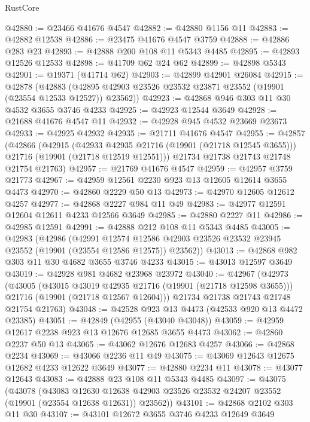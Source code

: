 \begin{lexlean}{RustCore}
\begin{coremodule}
@42880 := @23466 @41676 @4547
@42882 := @42880 @1156 @11
@42883 := @42882 @12538
@42886 := @23475 @41676 @4547 @3759
@42888 := @42886 @283 @23
@42893 := @42888 @200 @108 @11 @5343 @4485
@42895 := @42893 @12526 @12533
@42898 := @41709 @62 @24 @62
@42899 := @42898 @5343
@42901 := @19371 (@41714 @62)
@42903 := @42899 @42901 @26084
@42915 := @42878
    (@42883 (@42895 @42903 @23526 @23532 @23871 @23552 (@19901 (@23554 @12533 @12527)) @23562))
@42923 := @42868 @946 @303 @11 @30 @4532 @3655 @3746 @4233
@42925 := @42923 @12544 @3649
@42928 := @21688 @41676 @4547 @11
@42932 := @42928 @945 @4532 @23669 @23673
@42933 := @42925 @42932
@42935 := @21711 @41676 @4547
@42955 := @42857
    (@42866
      (@42915
        (@42933 @42935 @21716 (@19901 (@21718 @12545 @3655)))
        @21716
        (@19901 (@21718 @12519 @12551)))
      @21734
      @21738
      @21743
      @21748
      @21754
      @21763)
@42957 := @21769 @41676 @4547
@42959 := @42957 @3759 @21773
@42967 := @42959 @12561 @2230 @923 @13 @12605 @12614 @3655 @4473
@42970 := @42860 @2229 @50 @13
@42973 := @42970 @12605 @12612 @4257
@42977 := @42868 @2227 @984 @11 @49
@42983 := @42977 @12591 @12604 @12611 @4233 @12566 @3649
@42985 := @42880 @2227 @11
@42986 := @42985 @12591
@42991 := @42888 @212 @108 @11 @5343 @4485
@43005 := @42983
    (@42986
      (@42991
        @12574
        @12586
        @42903
        @23526
        @23532
        @23945
        @23552
        (@19901 (@23554 @12586 @12575))
        @23562))
@43013 := @42868 @982 @303 @11 @30 @4682 @3655 @3746 @4233
@43015 := @43013 @12597 @3649
@43019 := @42928 @981 @4682 @23968 @23972
@43040 := @42967
    (@42973
      (@43005
        (@43015 @43019 @42935 @21716 (@19901 (@21718 @12598 @3655)))
        @21716
        (@19901 (@21718 @12567 @12604)))
      @21734
      @21738
      @21743
      @21748
      @21754
      @21763)
@43048 := @42528 @923 @13 @4473 (@42533 @920 @13 @4472 @23385)
@43051 := @42849 (@42955 (@43040 @43048))
@43059 := @42959 @12617 @2238 @923 @13 @12676 @12685 @3655 @4473
@43062 := @42860 @2237 @50 @13
@43065 := @43062 @12676 @12683 @4257
@43066 := @42868 @2234
@43069 := @43066 @2236 @11 @49
@43075 := @43069 @12643 @12675 @12682 @4233 @12622 @3649
@43077 := @42880 @2234 @11
@43078 := @43077 @12643
@43083 := @42888 @23 @108 @11 @5343 @4485
@43097 := @43075
    (@43078
      (@43083
        @12630
        @12638
        @42903
        @23526
        @23532
        @24207
        @23552
        (@19901 (@23554 @12638 @12631))
        @23562))
@43101 := @42868 @2102 @303 @11 @30
@43107 := @43101 @12672 @3655 @3746 @4233 @12649 @3649

\end{coremodule}
\end{lexlean}
